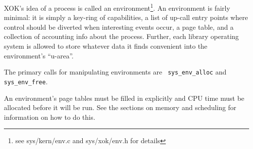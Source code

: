 
XOK's idea of a process is called an environment\footnote{see
sys/kern/env.c and sys/xok/env.h for details}. An environment is
fairly minimal: it is simply a key-ring of capabilities, a list of
up-call entry points where control should be diverted when interesting
events occur, a page table, and a collection of accounting info about
the process.  Further, each library operating system is allowed to
store whatever data it finds convenient into the environment's
``u-area''.

The primary calls for manipulating environments are {\tt
sys\_env\_alloc} and {\tt sys\_env\_free}.

An environment's page tables must be filled in explicitly and CPU time
must be allocated before it will be run. See the sections on memory
and scheduling for information on how to do this.
